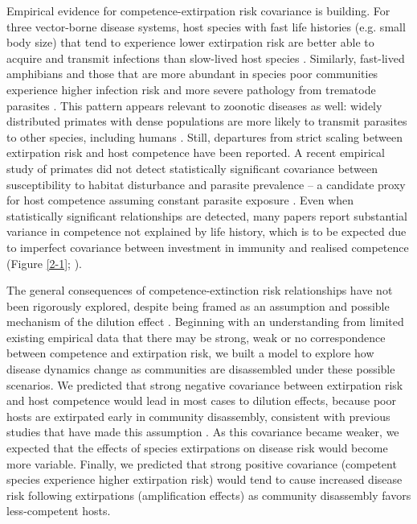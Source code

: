 Empirical evidence for competence-extirpation risk covariance is building.
For three vector-borne disease systems, host species with fast life histories (e.g. small body size) that tend to experience lower extirpation risk are better able to acquire and transmit infections than slow-lived host species \citep{Huang2013a}.
Similarly, fast-lived amphibians and those that are more abundant in species poor communities experience higher infection risk and more severe pathology from trematode parasites \citep{Johnson2012, Johnson2013}.
This pattern appears relevant to zoonotic diseases as well: widely distributed primates with dense populations are more likely to transmit parasites to other species, including humans \citep{Gomez2013}.
Still, departures from strict scaling between extirpation risk and host competence have been reported.
A recent empirical study of primates did not detect statistically significant covariance between susceptibility to habitat disturbance and parasite prevalence – a candidate proxy for host competence assuming constant parasite exposure \citep{Young2013}.
Even when statistically significant relationships are detected, many papers report substantial variance in competence not explained by life history, which is to be expected due to imperfect covariance between investment in immunity and realised competence (Figure \ref{2-1}; \cite{Johnson2012, Huang2013}).

The general consequences of competence-extinction risk relationships have not been rigorously explored, despite being framed as an assumption and possible mechanism of the dilution effect \citep{Randolph2012, Huang2013, Young2013}.
Beginning with an understanding from limited existing empirical data that there may be strong, weak or no correspondence between competence and extirpation risk, we built a model to explore how disease dynamics change as communities are disassembled under these possible scenarios.
We predicted that strong negative covariance between extirpation risk and host competence would lead in most cases to dilution effects, because poor hosts are extirpated early in community disassembly, consistent with previous studies that have made this assumption \citep{Roche2012}.
As this covariance became weaker, we expected that the effects of species extirpations on disease risk would become more variable.
Finally, we predicted that strong positive covariance (competent species experience higher extirpation risk) would tend to cause increased disease risk following extirpations (amplification effects) as community disassembly favors less-competent hosts.

